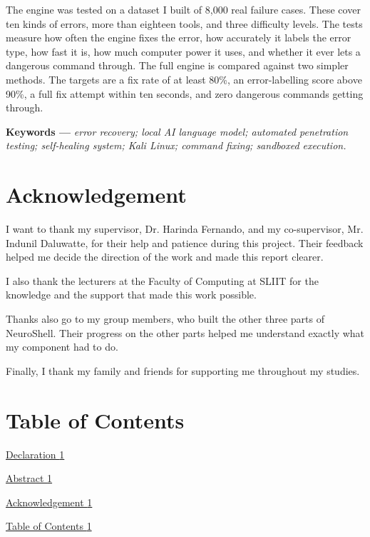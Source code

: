 \documentclass[
]{article}
\begin{document}
The engine was tested on a dataset I built of 8,000 real failure cases.
These cover ten kinds of errors, more than eighteen tools, and three
difficulty levels. The tests measure how often the engine fixes the
error, how accurately it labels the error type, how fast it is, how much
computer power it uses, and whether it ever lets a dangerous command
through. The full engine is compared against two simpler methods. The
targets are a fix rate of at least 80\%, an error-labelling score above
90\%, a full fix attempt within ten seconds, and zero dangerous commands
getting through.

\textbf{Keywords ---} \emph{error recovery; local AI language model;
automated penetration testing; self-healing system; Kali Linux; command
fixing; sandboxed execution.}

\hypertarget{acknowledgement}{%
\section{Acknowledgement}\label{acknowledgement}}

I want to thank my supervisor, Dr. Harinda Fernando, and my
co-supervisor, Mr. Indunil Daluwatte, for their help and patience during
this project. Their feedback helped me decide the direction of the work
and made this report clearer.

I also thank the lecturers at the Faculty of Computing at SLIIT for the
knowledge and the support that made this work possible.

Thanks also go to my group members, who built the other three parts of
NeuroShell. Their progress on the other parts helped me understand
exactly what my component had to do.

Finally, I thank my family and friends for supporting me throughout my
studies.

\hypertarget{table-of-contents}{%
\section{Table of Contents}\label{table-of-contents}}

\protect\hyperlink{declaration}{Declaration
\protect\hyperlink{declaration}{1}}

\protect\hyperlink{abstract}{Abstract \protect\hyperlink{abstract}{1}}

\protect\hyperlink{acknowledgement}{Acknowledgement
\protect\hyperlink{acknowledgement}{1}}

\protect\hyperlink{table-of-contents}{Table of Contents
\protect\hyperlink{table-of-contents}{1}}
\end{document}
